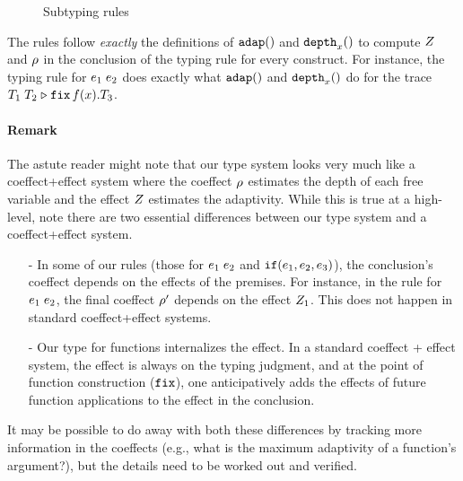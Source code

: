 \begin{figure}
\begin{mathpar}
    \end{mathpar}
 \caption{Subtyping rules}
  \label{fig:sub-type-rules}
\end{figure}


The rules follow \emph{exactly} the definitions of $\adap()$ and
$\ddep{x}()$ to compute $\nnatA$ and $\dmap$ in the conclusion of the
typing rule for every construct. For instance, the typing rule for
$\expr_1 \eapp \expr_2$ does exactly what $\adap()$ and $\ddep{x}()$
do for the trace $\trapp{\tr_1}{\tr_2}{f}{x}{\tr_3}$.

\paragraph{Remark}
The astute reader might note that our type system looks very much like
a coeffect+effect system where the coeffect $\dmap$ estimates the
depth of each free variable and the effect $\nnatA$ estimates the
adaptivity. While this is true at a high-level, note there are two
essential differences between our type system and a coeffect+effect
system.
\begin{itemize}
\item[-] In some of our rules (those for $\expr_1 \eapp \expr_2$ and
  $\eif(\expr_1, \expr_2, \expr_3)$), the conclusion's coeffect
  depends on the effects of the premises. For instance, in the rule
  for $\expr_1 \eapp \expr_2$, the final coeffect $\dmap'$ depends on
  the effect $\nnatA_1$. This does not happen in standard
  coeffect+effect systems.
\item[-] Our type for functions internalizes the effect. In a standard
  coeffect + effect system, the effect is always on the typing  judgment, and at the point of function construction ($\efix$), one
  anticipatively adds the effects of future function applications to
  the effect in the conclusion.
\end{itemize}
It may be possible to do away with both these differences by tracking
more information in the coeffects (e.g., what is the maximum
adaptivity of a function's argument?), but the details need to be
worked out and verified.
